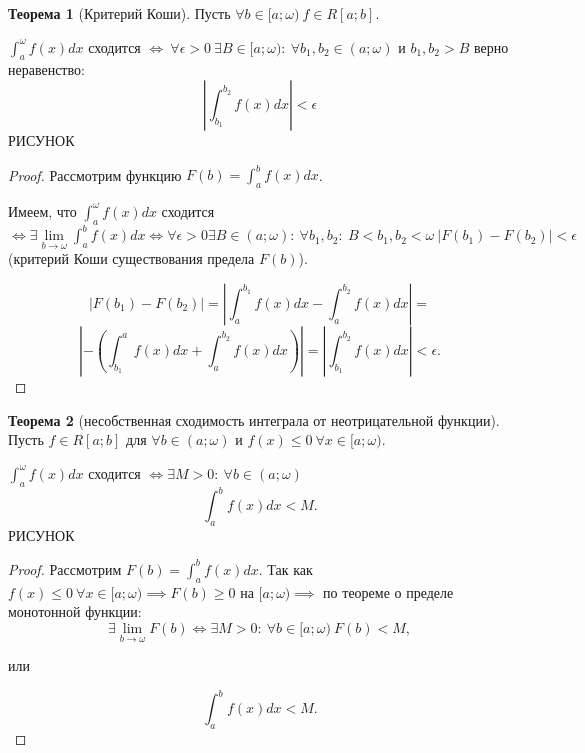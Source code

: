 \documentclass{report}
\theoremstyle{definition}
\newtheorem{theorem}{Теорема}[section]
\begin{document}
\begin{theorem}[Критерий Коши]
  Пусть $\forall b \in [a;\omega) \ f\in R[a;b]$.

  $\int_{a}^{\omega}f(x)dx$ сходится $\iff \ \forall
    \epsilon > 0 \ \exists B\in [a;\omega): \ \forall b_1,b_2 \in (a;\omega)$ и $b_1,b_2 > B$ верно неравенство:
  \begin{equation*}
    | \int_{b_1}^{b_2}f(x)dx | < \epsilon
  \end{equation*}
  {\Large РИСУНОК}
\end{theorem}

\begin{proof}
  Рассмотрим функцию $F(b) = \int_{a}^{b}f(x)dx$.

  Имеем, что $\int_{a}^{\omega}f(x)dx$ сходится $\iff \exists
    \underset{b\rightarrow\omega}{\lim}\int_{a}^{b}f(x)dx \iff \forall \epsilon > 0 \exists B \in(a;\omega): \
    \forall b_1,b_2: \ B < b_1,b_2 < \omega \ | F(b_1) - F(b_2) | < \epsilon$ (критерий Коши существования
  предела $F(b)$).

  \begin{equation*}
    | F(b_1) - F(b_2) | = | \int_{a}^{b_1}f(x)dx - \int_{a}^{b_2} f(x)dx | =
  \end{equation*}
  \begin{equation*}
    | -(\int_{b_1}^{a}f(x)dx + \int_{a}^{b_2}f(x)dx) | = | \int_{b_1}^{b_2}f(x)dx | < \epsilon.
  \end{equation*}
\end{proof}

\begin{theorem}[несобственная сходимость интеграла от неотрицательной функции]
  Пусть $f\in R[a;b]$ для $\forall b \in (a;\omega)$ и $f(x)\leqslant 0 \ \forall x \in [a;\omega).$

  $\int_{a}^{\omega}f(x)dx$ сходится $\iff \exists M > 0: \ \forall b \in (a;\omega)$
  \begin{equation*}
    \int_{a}^{b}f(x)dx < M.
  \end{equation*}
  {\Large РИСУНОК}
\end{theorem}

\begin{proof}
  Рассмотрим $F(b) = \int_{a}^{b}f(x)dx$. Так как $f(x)\leqslant0 \ \forall x\in[a;\omega)\implies
    F(b) \geqslant 0$ на $[a;\omega) \implies$ по теореме о пределе монотонной функции:
  \begin{equation*}
    \exists \underset{b\rightarrow\omega}{\lim}F(b)\iff \exists M > 0: \ \forall b\in[a;\omega) \ F(b) < M,
  \end{equation*}
  \begin{center}
    или
  \end{center}
  \begin{equation*}
    \int_{a}^{b}f(x)dx < M.
  \end{equation*}
\end{proof}
\end{document}
